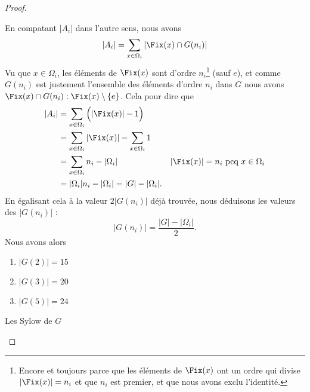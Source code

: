 \begin{proof}
\begin{subproof}
                En compatant \( | A_i |\) dans l'autre sens, nous avons
                \begin{equation}        \label{EQooBHIIooVcGgFd}
                    | A_i |=\sum_{x\in \Omega_i}|  \Fix(x)\cap G(n_i) |
                \end{equation}
                Vu que \( x\in \Omega_i\), les éléments de \( \Fix(x)\) sont d'ordre \( n_i\)\footnote{Encore et toujours parce que les éléments de \( \Fix(x)\) ont un ordre qui divise \( | \Fix(x) |=n_i\) et que \( n_i\) est premier, et que nous avons exclu l'identité.} (sauf \( e\)), et comme \( G(n_i)\) est justement l'ensemble des éléments d'ordre \( n_i\) dans \( G\) nous avons \( \Fix(x)\cap G(n_i):\Fix(x)\setminus\{ e \}\). Cela pour dire que
                \begin{subequations}
                    \begin{align}
                        | A_i |&=\sum_{x\in \Omega_i}\Big( |\Fix(x)|-1\Big)\\
                        &=\sum_{x\in \Omega_i}| \Fix(x) |-\sum_{x\in \Omega_i}1\\
                        &=\sum_{x\in \Omega_i}n_i-| \Omega_i |  & | \Fix(x) |=n_i \text{ pcq }x\in\Omega_i\\
                        &=| \Omega_i |n_i-| \Omega_i |=| G |-| \Omega_i |.
                    \end{align}
                \end{subequations}
                En égalisant cela à la valeur \( 2|G(n_i)|\) déjà trouvée, nous déduisons les valeurs des \( | G(n_i) |\) :
                \begin{equation}
                    | G(n_i) |=\frac{ | G |-| \Omega_i | }{2}.
                \end{equation}
                Nous avons alors
                \begin{enumerate}
                    \item
                        \( | G(2) |=15\)
                    \item
                        \( | G(3) |=20\)
                    \item
                        \( | G(5) |=24\)
                \end{enumerate}

            \item[Les Sylow de \( G\)]


\end{subproof}
\end{proof}
